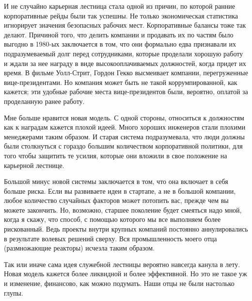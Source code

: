 \documentclass[ebook,12pt,oneside,openany]{memoir}
\begin{document}
И не случайно карьерная лестница стала одной из причин, по которой
ранние корпоративные рейды были так успешны. Не только экономическая
статистика игнорирует значения безопасных рабочих мест. Корпоративные
балансы тоже так делают. Причиной того, что делить компании и
продавать их по частям было выгодно в 1980-ых заключается в том, что
они формально едва признавали их подразумеваемый долг перед
сотрудниками, которые проделали хорошую работу и ждали за нее награду
в виде высокооплачиваемых должностей, когда придет их время. В фильме
Уолл-Стрит, Гордон Гекко высмеивает компании, перегруженные
вице-президентами. Но компания может быть не такой коррумпированной,
как кажется; эти удобные рабочие места вице-президентов были,
вероятно, оплатой за проделанную ранее работу. \newline

Мне больше нравится новая модель. С одной стороны, относиться к
должностям как к наградам кажется плохой идеей. Много хороших
инженеров стали плохими менеджерами таким образом. И старая система
подразумевала, что люди должны были столкнуться с гораздо большим
количеством корпоративной политики, для того чтобы защитить те усилия,
которые они вложили в свое положение на карьерной лестнице. \newline

Большой минус новой системы заключается в том, что она включает в себя
больше риска. Если вы развиваете идеи в стартапе, а не в большой
компании, любое количество случайных факторов может потопить вас,
прежде чем вы можете закончить. Но, возможно, старшее поколение будет
смеяться надо мной, когда я скажу, что способ, с помощью которого мы
все выполняем более рискованный. Ведь проекты внутри крупных компаний
постоянно аннулировались в результате волевых решений сверху. Вся
промышленность моего отца (размножающие реакторы) исчезла таким
образом. \newline

Так или иначе сама идея служебной лестницы вероятно навсегда канула в
лету. Новая модель кажется более ликвидной и более эффективной. Но это
не такое уж и изменение, финансово, как можно подумать. Наши отцы не
были настолько глупы. 
\end{document}
